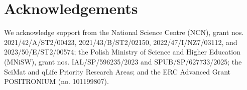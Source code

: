 \documentclass[10pt,twocolumn]{article}
\begin{document}
\section*{Acknowledgements}

We acknowledge support from the National Science Centre (NCN), grant nos. 2021/42/A/ST2/00423, 2021/43/B/ST2/02150, 2022/47/I/NZ7/03112, and 2023/50/E/ST2/00574; the Polish Ministry of Science and Higher Education (MNiSW), grant nos. IAL/SP/596235/2023 and SPUB/SP/627733/2025; the SciMat and qLife Priority Research Areas; and the ERC Advanced Grant POSITRONIUM (no. 101199807).

\balance
\printbibliography
\end{document}
